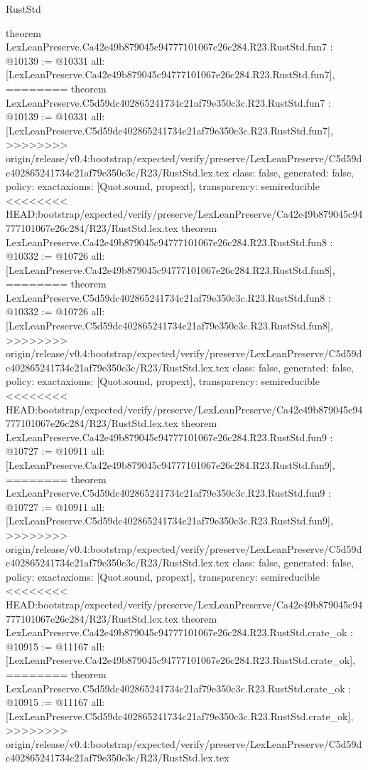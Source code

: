 \begin{lexlean}{RustStd}
\begin{coremodule}
{\begin{coremodule}
{{{{{{{{{theorem LexLeanPreserve.Ca42e49b879045c94777101067e26c284.R23.RustStd.fun7 : @10139 := @10331 {
  all: [LexLeanPreserve.Ca42e49b879045c94777101067e26c284.R23.RustStd.fun7],
========
theorem LexLeanPreserve.C5d59dc402865241734c21af79e350c3c.R23.RustStd.fun7 : @10139 := @10331 {
  all: [LexLeanPreserve.C5d59dc402865241734c21af79e350c3c.R23.RustStd.fun7],
>>>>>>>> origin/release/v0.4:bootstrap/expected/verify/preserve/LexLeanPreserve/C5d59dc402865241734c21af79e350c3c/R23/RustStd.lex.tex
  class: false,
  generated: false,
  policy: exact{axioms: [Quot.sound, propext]},
  transparency: semireducible
}
<<<<<<<< HEAD:bootstrap/expected/verify/preserve/LexLeanPreserve/Ca42e49b879045c94777101067e26c284/R23/RustStd.lex.tex
theorem LexLeanPreserve.Ca42e49b879045c94777101067e26c284.R23.RustStd.fun8 : @10332 := @10726 {
  all: [LexLeanPreserve.Ca42e49b879045c94777101067e26c284.R23.RustStd.fun8],
========
theorem LexLeanPreserve.C5d59dc402865241734c21af79e350c3c.R23.RustStd.fun8 : @10332 := @10726 {
  all: [LexLeanPreserve.C5d59dc402865241734c21af79e350c3c.R23.RustStd.fun8],
>>>>>>>> origin/release/v0.4:bootstrap/expected/verify/preserve/LexLeanPreserve/C5d59dc402865241734c21af79e350c3c/R23/RustStd.lex.tex
  class: false,
  generated: false,
  policy: exact{axioms: [Quot.sound, propext]},
  transparency: semireducible
}
<<<<<<<< HEAD:bootstrap/expected/verify/preserve/LexLeanPreserve/Ca42e49b879045c94777101067e26c284/R23/RustStd.lex.tex
theorem LexLeanPreserve.Ca42e49b879045c94777101067e26c284.R23.RustStd.fun9 : @10727 := @10911 {
  all: [LexLeanPreserve.Ca42e49b879045c94777101067e26c284.R23.RustStd.fun9],
========
theorem LexLeanPreserve.C5d59dc402865241734c21af79e350c3c.R23.RustStd.fun9 : @10727 := @10911 {
  all: [LexLeanPreserve.C5d59dc402865241734c21af79e350c3c.R23.RustStd.fun9],
>>>>>>>> origin/release/v0.4:bootstrap/expected/verify/preserve/LexLeanPreserve/C5d59dc402865241734c21af79e350c3c/R23/RustStd.lex.tex
  class: false,
  generated: false,
  policy: exact{axioms: [Quot.sound, propext]},
  transparency: semireducible
}
<<<<<<<< HEAD:bootstrap/expected/verify/preserve/LexLeanPreserve/Ca42e49b879045c94777101067e26c284/R23/RustStd.lex.tex
theorem LexLeanPreserve.Ca42e49b879045c94777101067e26c284.R23.RustStd.crate_ok : @10915 := @11167 {
  all: [LexLeanPreserve.Ca42e49b879045c94777101067e26c284.R23.RustStd.crate_ok],
========
theorem LexLeanPreserve.C5d59dc402865241734c21af79e350c3c.R23.RustStd.crate_ok : @10915 := @11167 {
  all: [LexLeanPreserve.C5d59dc402865241734c21af79e350c3c.R23.RustStd.crate_ok],
>>>>>>>> origin/release/v0.4:bootstrap/expected/verify/preserve/LexLeanPreserve/C5d59dc402865241734c21af79e350c3c/R23/RustStd.lex.tex
}}}}}}}}}}}}}}
\end{coremodule}}
\end{coremodule}
\end{lexlean}
